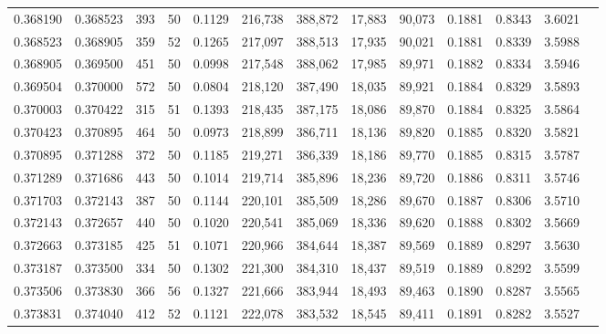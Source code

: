 \begin{tabular}{rrrrrrrrrrrrr}
0.368190 & 0.368523 &   393 &  50 &                                     0.1129 & 216,738 & 388,872 &  17,883 &  90,073 & 0.1881 & 0.8343 & 3.6021 \\
0.368523 & 0.368905 &   359 &  52 &                                     0.1265 & 217,097 & 388,513 &  17,935 &  90,021 & 0.1881 & 0.8339 & 3.5988 \\
0.368905 & 0.369500 &   451 &  50 &                                     0.0998 & 217,548 & 388,062 &  17,985 &  89,971 & 0.1882 & 0.8334 & 3.5946 \\
0.369504 & 0.370000 &   572 &  50 &                                     0.0804 & 218,120 & 387,490 &  18,035 &  89,921 & 0.1884 & 0.8329 & 3.5893 \\
0.370003 & 0.370422 &   315 &  51 &                                     0.1393 & 218,435 & 387,175 &  18,086 &  89,870 & 0.1884 & 0.8325 & 3.5864 \\
0.370423 & 0.370895 &   464 &  50 &                                     0.0973 & 218,899 & 386,711 &  18,136 &  89,820 & 0.1885 & 0.8320 & 3.5821 \\
0.370895 & 0.371288 &   372 &  50 &                                     0.1185 & 219,271 & 386,339 &  18,186 &  89,770 & 0.1885 & 0.8315 & 3.5787 \\
0.371289 & 0.371686 &   443 &  50 &                                     0.1014 & 219,714 & 385,896 &  18,236 &  89,720 & 0.1886 & 0.8311 & 3.5746 \\
0.371703 & 0.372143 &   387 &  50 &                                     0.1144 & 220,101 & 385,509 &  18,286 &  89,670 & 0.1887 & 0.8306 & 3.5710 \\
0.372143 & 0.372657 &   440 &  50 &                                     0.1020 & 220,541 & 385,069 &  18,336 &  89,620 & 0.1888 & 0.8302 & 3.5669 \\
0.372663 & 0.373185 &   425 &  51 &                                     0.1071 & 220,966 & 384,644 &  18,387 &  89,569 & 0.1889 & 0.8297 & 3.5630 \\
0.373187 & 0.373500 &   334 &  50 &                                     0.1302 & 221,300 & 384,310 &  18,437 &  89,519 & 0.1889 & 0.8292 & 3.5599 \\
0.373506 & 0.373830 &   366 &  56 &                                     0.1327 & 221,666 & 383,944 &  18,493 &  89,463 & 0.1890 & 0.8287 & 3.5565 \\
0.373831 & 0.374040 &   412 &  52 &                                     0.1121 & 222,078 & 383,532 &  18,545 &  89,411 & 0.1891 & 0.8282 & 3.5527 \\

\end{tabular}

